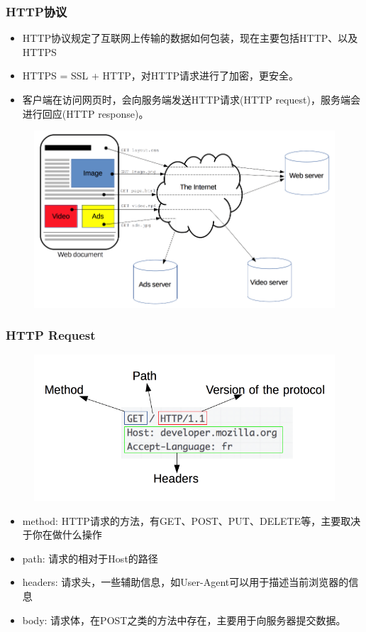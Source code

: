 \documentclass[9pt]{beamer}
\begin{document}
\begin{frame}
    \frametitle{HTTP协议}

    \begin{itemize}
        \item HTTP协议规定了互联网上传输的数据如何包装，现在主要包括HTTP、以及HTTPS
        \item HTTPS = SSL + HTTP，对HTTP请求进行了加密，更安全。
        \item 客户端在访问网页时，会向服务端发送HTTP请求(HTTP request)，服务端会进行回应(HTTP response)。
    \end{itemize}

   \begin{figure}
    \centering
    \includegraphics[height=0.5\paperheight]{figures/fetching_a_page.png}
   \end{figure}

\end{frame}

\begin{frame}
    \frametitle{HTTP Request}
    \begin{figure}
        \centering
        \includegraphics[height=0.5\paperheight]{figures/http_request.png}
       \end{figure}

\begin{itemize}
\item method: HTTP请求的方法，有GET、POST、PUT、DELETE等，主要取决于你在做什么操作
\item path: 请求的相对于Host的路径
\item headers: 请求头，一些辅助信息，如User-Agent可以用于描述当前浏览器的信息
\item body: 请求体，在POST之类的方法中存在，主要用于向服务器提交数据。
\end{itemize}
\end{frame}
\end{document}
